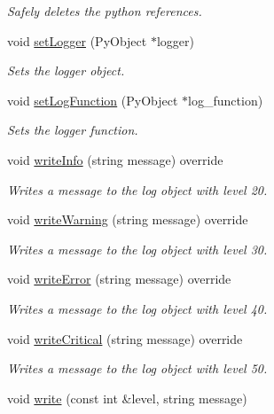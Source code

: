 \begin{DoxyCompactItemize}
\begin{DoxyCompactList}\small\item\em Safely deletes the python references. \end{DoxyCompactList}\item 
void \hyperlink{class_py_logger_abedc912ce779111d343a739b72316498}{set\+Logger} (Py\+Object $\ast$logger)
\begin{DoxyCompactList}\small\item\em Sets the logger object. \end{DoxyCompactList}\item 
void \hyperlink{class_py_logger_afee8574d4db27060530daf1c54daf4ce}{set\+Log\+Function} (Py\+Object $\ast$log\+\_\+function)
\begin{DoxyCompactList}\small\item\em Sets the logger function. \end{DoxyCompactList}\item 
void \hyperlink{class_py_logger_a1c9735d6b83c1fad66bb6560cd753616}{write\+Info} (string message) override
\begin{DoxyCompactList}\small\item\em Writes a message to the log object with level 20. \end{DoxyCompactList}\item 
void \hyperlink{class_py_logger_acba053c66f9e6d2c3fd83a83b495afe4}{write\+Warning} (string message) override
\begin{DoxyCompactList}\small\item\em Writes a message to the log object with level 30. \end{DoxyCompactList}\item 
void \hyperlink{class_py_logger_a445bc845376cd5abd65b25c534192a47}{write\+Error} (string message) override
\begin{DoxyCompactList}\small\item\em Writes a message to the log object with level 40. \end{DoxyCompactList}\item 
void \hyperlink{class_py_logger_aa71e9531bf2bc4084427a78016407666}{write\+Critical} (string message) override
\begin{DoxyCompactList}\small\item\em Writes a message to the log object with level 50. \end{DoxyCompactList}\item 
void \hyperlink{class_py_logger_a251422c4f32349547cac003379459be7}{write} (const int \&level, string message)

\end{DoxyCompactItemize}
